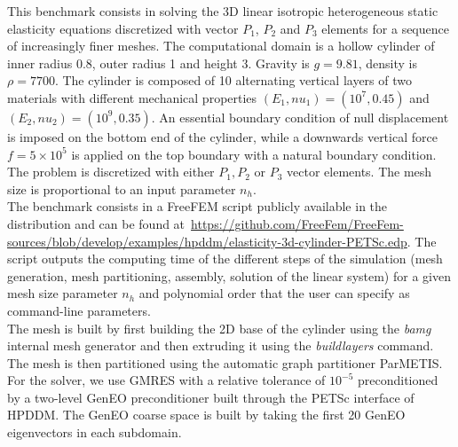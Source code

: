 This benchmark consists in solving the 3D linear isotropic heterogeneous static elasticity equations discretized with vector $P_1$, $P_2$ and $P_3$ elements for a sequence of increasingly finer meshes. The computational domain is a hollow cylinder of inner radius 0.8, outer radius 1 and height 3. Gravity is $g = 9.81$, density is $\rho = 7700$. The cylinder is composed of 10 alternating vertical layers of two materials with different mechanical properties $(E_1, nu_1) = (10^7, 0.45)$ and $(E_2, nu_2) = (10^9, 0.35)$. An essential boundary condition of null displacement is imposed on the bottom end of the cylinder, while a downwards vertical force $f = 5 \times 10^5$ is applied on the top boundary with a natural boundary condition.\\
The problem is discretized with either $P_1, P_2$ or $P_3$ vector elements. The mesh size is proportional to an input parameter ${n}_h$.\\

The benchmark consists in a FreeFEM script publicly available in the distribution and can be found at~\url{https://github.com/FreeFem/FreeFem-sources/blob/develop/examples/hpddm/elasticity-3d-cylinder-PETSc.edp}. The script outputs the computing time of the different steps of the simulation (mesh generation, mesh partitioning, assembly, solution of the linear system) for a given mesh size parameter ${n}_h$ and polynomial order that the user can specify as command-line parameters.\\

The mesh is built by first building the 2D base of the cylinder using the \textit{bamg} internal mesh generator and then extruding it using the \textit{buildlayers} command. The mesh is then partitioned using the automatic graph partitioner ParMETIS. For the solver, we use GMRES with a relative tolerance of $10^{-5}$ preconditioned by a two-level GenEO preconditioner built through the PETSc interface of HPDDM. The GenEO coarse space is built by taking the first 20 GenEO eigenvectors in each subdomain.

